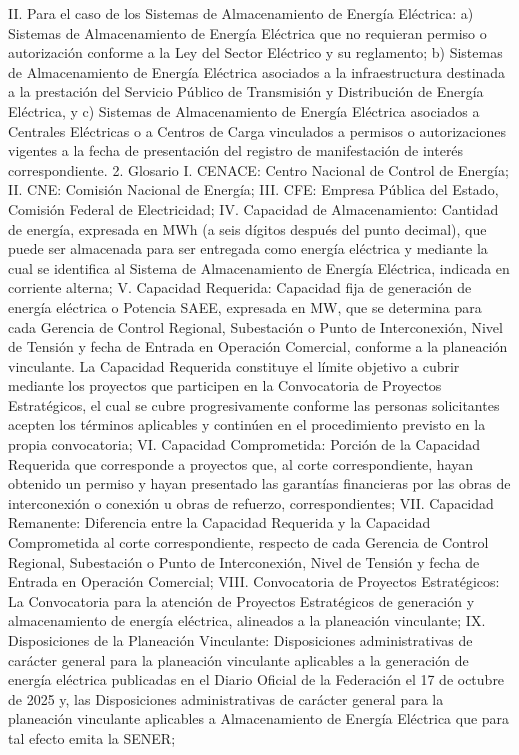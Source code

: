 II. Para el caso de los Sistemas de Almacenamiento de Energía Eléctrica:
a) Sistemas de Almacenamiento de Energía Eléctrica que no requieran permiso o autorización conforme a la Ley del Sector Eléctrico y su reglamento;
b) Sistemas de Almacenamiento de Energía Eléctrica asociados a la infraestructura destinada a la prestación del Servicio Público de Transmisión y Distribución de Energía Eléctrica, y
c) Sistemas de Almacenamiento de Energía Eléctrica asociados a Centrales Eléctricas o a Centros de Carga vinculados a permisos o autorizaciones vigentes a la fecha de presentación del registro de manifestación de interés correspondiente.
2. Glosario
I. CENACE: Centro Nacional de Control de Energía;
II. CNE: Comisión Nacional de Energía;
III. CFE: Empresa Pública del Estado, Comisión Federal de Electricidad;
IV. Capacidad de Almacenamiento: Cantidad de energía, expresada en MWh (a seis dígitos después del punto decimal), que puede ser almacenada para ser entregada como energía eléctrica y mediante la cual se identifica al Sistema de Almacenamiento de Energía Eléctrica, indicada en corriente alterna;
V. Capacidad Requerida: Capacidad fija de generación de energía eléctrica o Potencia SAEE, expresada en MW, que se determina para cada Gerencia de Control Regional, Subestación o Punto de Interconexión, Nivel de Tensión y fecha de Entrada en Operación Comercial, conforme a la planeación vinculante. La Capacidad Requerida constituye el límite objetivo a cubrir mediante los proyectos que participen en la Convocatoria de Proyectos Estratégicos, el cual se cubre progresivamente conforme las personas solicitantes acepten los términos aplicables y continúen en el procedimiento previsto en la propia convocatoria;
VI. Capacidad Comprometida: Porción de la Capacidad Requerida que corresponde a proyectos que, al corte correspondiente, hayan obtenido un permiso y hayan presentado las garantías financieras por las obras de interconexión o conexión u obras de refuerzo, correspondientes;
VII. Capacidad Remanente: Diferencia entre la Capacidad Requerida y la Capacidad Comprometida al corte correspondiente, respecto de cada Gerencia de Control Regional, Subestación o Punto de Interconexión, Nivel de Tensión y fecha de Entrada en Operación Comercial;
VIII. Convocatoria de Proyectos Estratégicos: La Convocatoria para la atención de Proyectos Estratégicos de generación y almacenamiento de energía eléctrica, alineados a la planeación vinculante;
IX. Disposiciones de la Planeación Vinculante: Disposiciones administrativas de carácter general para la planeación vinculante aplicables a la generación de energía eléctrica publicadas en el Diario Oficial de la Federación el 17 de octubre de 2025 y, las Disposiciones administrativas de carácter general para la planeación vinculante aplicables a Almacenamiento de Energía Eléctrica que para tal efecto emita la SENER;
